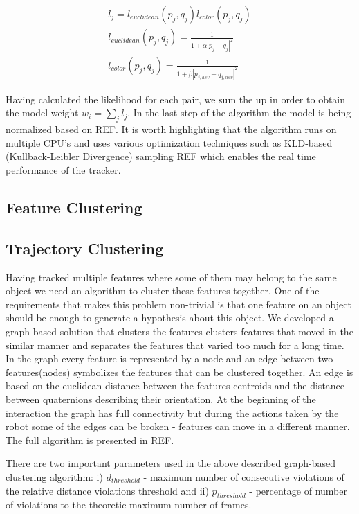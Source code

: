 \begin{eqnarray}
  l_{j} = l_{euclidean}(p_{j},q_{j})l_{color}(p_{j},q_{j}) \nonumber \\
  l_{euclidean}(p_{j},q_{j}) = \frac{1}{1+\alpha|p_{j}-q_{j}|^2} \nonumber \\
  l_{color}(p_{j},q_{j}) = \frac{1}{1+\beta|p_{j,hsv}-q_{j,hsv}|^2} 
  \label{eq:likelihood}
\end{eqnarray} 

Having calculated the likelihood for each pair, we sum the up in order to obtain the model weight $w_{i} = \sum\limits_{j}l_{j}$. In the last step of the algorithm the model is being normalized based on REF. It is worth highlighting that the algorithm runs on multiple CPU's and uses various optimization techniques such as KLD-based 
(Kullback-Leibler Divergence) sampling REF which enables the real time performance of the tracker.


\subsection{Feature Clustering}

\subsection{Trajectory Clustering}
\label{sec:clustering}

Having tracked multiple features where some of them may belong to the same object we need an algorithm to cluster these features together. One of the requirements that makes this problem non-trivial is that one feature on an object should be enough to generate a hypothesis about this object. We developed a graph-based solution that clusters the features clusters features that moved in the similar manner and separates the features that varied too much for a long time. In the graph every feature is represented by a node and an edge between two features(nodes) symbolizes the features that can be clustered together. An edge is based on the euclidean distance between the features centroids and the distance between quaternions describing their orientation. At the beginning of the interaction the graph has full connectivity but during the actions taken by the robot some of the edges can be broken - features can move in a different manner.
The full algorithm is presented in REF.

There are two important parameters used in the above described graph-based clustering algorithm: i) $d_{threshold}$ - maximum number of consecutive violations of the relative distance violations threshold and ii) $p_{threshold}$ - percentage of number of violations to the theoretic maximum number of frames.

